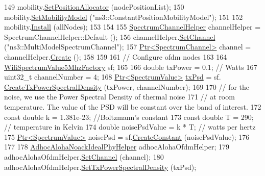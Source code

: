 \begin{DoxyCode}
149   mobility.\hyperlink{classns3_1_1MobilityHelper_ac59d5295076be3cc11021566713a28c5}{SetPositionAllocator} (nodePositionList);
150   mobility.\hyperlink{classns3_1_1MobilityHelper_a030275011b6f40682e70534d30280aba}{SetMobilityModel} (\textcolor{stringliteral}{"ns3::ConstantPositionMobilityModel"});
151 
152   mobility.\hyperlink{classns3_1_1MobilityHelper_a07737960ee95c0777109cf2994dd97ae}{Install} (allNodes);
153 
154 
155   \hyperlink{classns3_1_1SpectrumChannelHelper}{SpectrumChannelHelper} channelHelper = SpectrumChannelHelper::Default ();
156   channelHelper.\hyperlink{classns3_1_1SpectrumChannelHelper_a11ffe86edea8cdd30f181e41c0e3e29f}{SetChannel} (\textcolor{stringliteral}{"ns3::MultiModelSpectrumChannel"});
157   \hyperlink{classns3_1_1Ptr}{Ptr<SpectrumChannel>} channel = channelHelper.\hyperlink{classns3_1_1SpectrumChannelHelper_a419ea84f5046763085f94f38af319fb9}{Create} ();
158 
159 
161   \textcolor{comment}{// Configure ofdm nodes}
163 \textcolor{comment}{}
164   \hyperlink{classns3_1_1WifiSpectrumValue5MhzFactory}{WifiSpectrumValue5MhzFactory} sf;
165 
166   \textcolor{keywordtype}{double} txPower = 0.1; \textcolor{comment}{// Watts}
167   uint32\_t channelNumber = 4;
168   \hyperlink{classns3_1_1Ptr}{Ptr<SpectrumValue>} \hyperlink{lte__link__budget_8m_a684fe3101a5e48a5fcc57cab8dbcd1aa}{txPsd} =  sf.
      \hyperlink{classns3_1_1WifiSpectrumValue5MhzFactory_aa3045151889d535e6e7bf40e0855a92f}{CreateTxPowerSpectralDensity} (txPower, channelNumber);
169 
170   \textcolor{comment}{// for the noise, we use the Power Spectral Density of thermal noise}
171   \textcolor{comment}{// at room temperature. The value of the PSD will be constant over the band of interest.}
172   \textcolor{keyword}{const} \textcolor{keywordtype}{double} k = 1.381e-23; \textcolor{comment}{//Boltzmann's constant}
173   \textcolor{keyword}{const} \textcolor{keywordtype}{double} T = 290; \textcolor{comment}{// temperature in Kelvin}
174   \textcolor{keywordtype}{double} noisePsdValue = k * T; \textcolor{comment}{// watts per hertz}
175   \hyperlink{classns3_1_1Ptr}{Ptr<SpectrumValue>} noisePsd = sf.\hyperlink{classns3_1_1WifiSpectrumValue5MhzFactory_a32a04dc83a836da0fcfcc387cabc097f}{CreateConstant} (noisePsdValue);
176 
177 
178   \hyperlink{classns3_1_1AdhocAlohaNoackIdealPhyHelper}{AdhocAlohaNoackIdealPhyHelper} adhocAlohaOfdmHelper;
179   adhocAlohaOfdmHelper.\hyperlink{classns3_1_1AdhocAlohaNoackIdealPhyHelper_a9d2c05e23d722e63dafa2d083313ecdb}{SetChannel} (channel);
180   adhocAlohaOfdmHelper.\hyperlink{classns3_1_1AdhocAlohaNoackIdealPhyHelper_a3acada700018db8e04a7a209e4cdf94e}{SetTxPowerSpectralDensity} (txPsd);

\end{DoxyCode}
